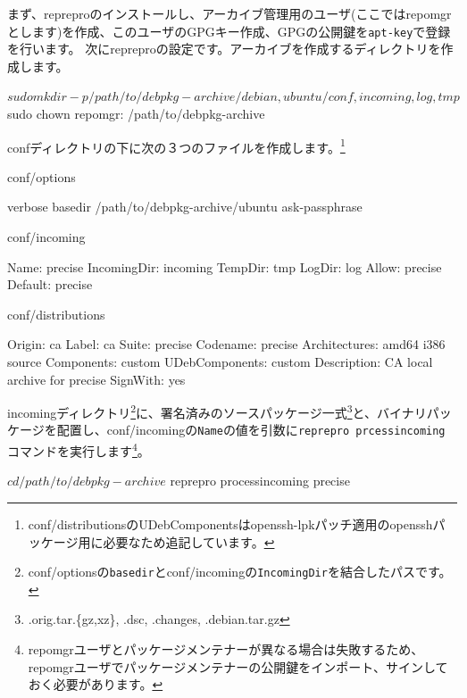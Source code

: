 \documentclass[mingoth,a4paper,twoside]{jsarticle}
\begin{document}
まず、repreproのインストールし、アーカイブ管理用のユーザ(ここではrepomgrとします)を作成、このユーザのGPGキー作成、GPGの公開鍵を\texttt{apt-key}で登録を行います。
次にrepreproの設定です。アーカイブを作成するディレクトリを作成します。

\begin{commandline}
$ sudo mkdir -p /path/to/debpkg-archive/{debian,ubuntu}/{conf,incoming,log,tmp}
$ sudo chown repomgr: /path/to/debpkg-archive
\end{commandline}

confディレクトリの下に次の３つのファイルを作成します。\footnote{conf/distributionsのUDebComponentsはopenssh-lpkパッチ適用のopensshパッケージ用に必要なため追記しています。}


\begin{minipage}[t]{0.32\hsize}
conf/options
\begin{commandline}
verbose
basedir /path/to/debpkg-archive/ubuntu
ask-passphrase
\end{commandline}
\end{minipage}
\begin{minipage}[t]{0.20\hsize}
conf/incoming
\begin{commandline}
Name: precise
IncomingDir: incoming
TempDir: tmp
LogDir: log
Allow: precise
Default: precise
\end{commandline}
\end{minipage}
\begin{minipage}[t]{0.33\hsize}
conf/distributions
\begin{commandline}
Origin: ca
Label: ca
Suite: precise
Codename: precise
Architectures: amd64 i386 source
Components: custom
UDebComponents: custom
Description: CA local archive for precise
SignWith: yes
\end{commandline}
\end{minipage}

incomingディレクトリ\footnote{conf/optionsの\texttt{basedir}とconf/incomingの\texttt{IncomingDir}を結合したパスです。}に、署名済みのソースパッケージ一式\footnote{.orig.tar.\{gz,xz\}, .dsc, .changes, .debian.tar.gz}と、バイナリパッケージを配置し、conf/incomingの\texttt{Name}の値を引数に\texttt{reprepro prcessincoming}コマンドを実行します\footnote{repomgrユーザとパッケージメンテナーが異なる場合は失敗するため、repomgrユーザでパッケージメンテナーの公開鍵をインポート、サインしておく必要があります。}。

\begin{commandline}
$ cd /path/to/debpkg-archive
$ reprepro processincoming precise
\end{commandline}
\end{document}
